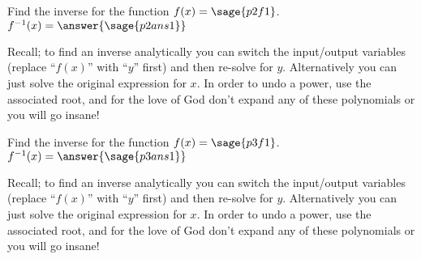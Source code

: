 \documentclass{ximera}
\begin{document}
\begin{problem}
    Find the inverse for the function $f(x) = \sage{p2f1}$.\\
    
    $f^{-1}(x) = \answer{\sage{p2ans1}}$
    \begin{feedback}
        Recall; to find an inverse analytically you can switch the input/output variables (replace ``$f(x)$'' with ``$y$'' first) and then re-solve for $y$. Alternatively you can just solve the original expression for $x$. In order to undo a power, use the associated root, and for the love of God don't expand any of these polynomials or you will go insane!
    \end{feedback}
\end{problem}


\begin{problem}
    Find the inverse for the function $f(x) = \sage{p3f1}$.\\
    
    $f^{-1}(x) = \answer{\sage{p3ans1}}$
    \begin{feedback}
        Recall; to find an inverse analytically you can switch the input/output variables (replace ``$f(x)$'' with ``$y$'' first) and then re-solve for $y$. Alternatively you can just solve the original expression for $x$. In order to undo a power, use the associated root, and for the love of God don't expand any of these polynomials or you will go insane!
    \end{feedback}
\end{problem}
\end{document}
